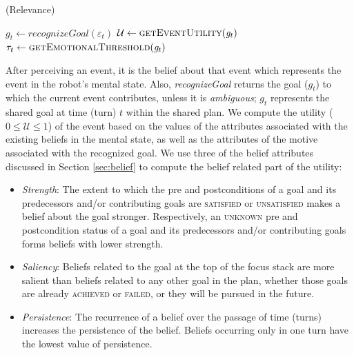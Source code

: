 \documentclass{article}
\begin{document}
\vspace*{-2mm}
\begin{algorithm}
	\caption{(Relevance)}
	\label{alg:relevance}
	\begin{algorithmic}[1]
			\Statex
			\State $\mathit{g}_{t} \gets \textit{recognizeGoal}{(\varepsilon_t)}$
			\Statex
			\State $\mathcal{U} \gets \Call{getEventUtility}{\mathit{g}_{t}}$ 
			\State $\tau_{t} \gets \Call{getEmotionalThreshold}{\mathit{g}_{t}}$
			\Statex
				\State {}
			\Else
				\State {}
			\EndIf
		\EndFunction
	\end{algorithmic}
\end{algorithm}

\vspace*{-3mm}
After perceiving an event, it is the belief about that event which represents
the event in the robot's mental state. Also, \textit{recognizeGoal} returns
the goal ($g_{t}$) to which the current event contributes, unless it is
\textit{ambiguous}; $g_{t}$ represents the shared goal at time (turn) $t$ within
the shared plan. We compute the utility ($0 \leq \mathcal{U} \leq 1$) of the
event based on the values of the attributes associated with the existing beliefs
in the mental state, as well as the attributes of the motive associated with the
recognized goal. We use three of the belief attributes discussed in Section
\ref{sec:belief} to compute the belief related part of the utility: 

\vspace*{-2mm}
\begin{itemize}[leftmargin=2pt]
  \setlength\itemsep{0.2mm}
  \item \textit{Strength}: The extent to which the pre and postconditions of a
  goal and its predecessors and/or contributing goals are \textsc{satisfied} or
  \textsc{unsatisfied} makes a belief about the goal stronger.
  Respectively, an \textsc{unknown} pre and postcondition status of a goal and
  its predecessors and/or contributing goals forms beliefs with lower strength.
  \item \textit{Saliency}: Beliefs related to the goal at the top of the focus
  stack are more salient than beliefs related to any other goal in the plan,
  whether those goals are already \textsc{achieved} or \textsc{failed}, or they
  will be pursued in the future.
  \item \textit{Persistence}: The recurrence of a belief over the passage of
  time (turns) increases the persistence of the belief. Beliefs occurring only
  in one turn have the lowest value of persistence.
\end{itemize}
\end{document}
